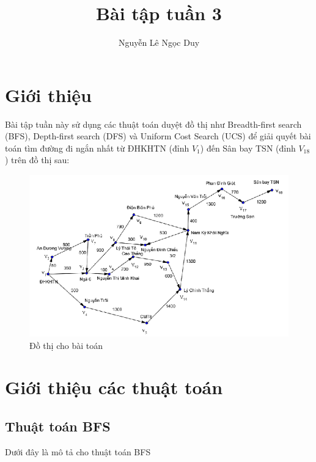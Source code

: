 \documentclass[a4paper, 11pt]{article}
\title{Bài tập tuần 3}
\author{Nguyễn Lê Ngọc Duy}
\date{}
\begin{document}
\maketitle
\tableofcontents

\pagebreak

\section{Giới thiệu}

Bài tập tuần này sử dụng các thuật toán duyệt đồ thị như Breadth-first search (BFS), Depth-first search (DFS) và Uniform Cost Search (UCS) để giải quyết bài toán tìm đường đi ngắn nhất từ ĐHKHTN (đỉnh $V_{1}$) đến Sân bay TSN (đỉnh $V_{18}$) trên đồ thị sau:

\begin{figure}[h]
    \centering
    \includegraphics[]{problem.png}
    \caption{Đồ thị cho bài toán}
\end{figure}
\clearpage

\section{Giới thiệu các thuật toán}

\subsection{Thuật toán BFS}

Dưới đây là mô tả cho thuật toán BFS
\end{document}
